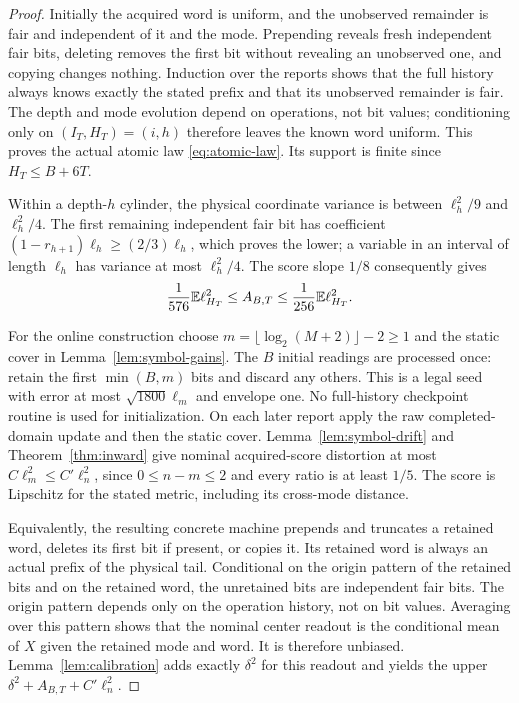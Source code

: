 \begin{proof}
Initially the acquired word is uniform, and the unobserved remainder is fair and independent of it and the mode. Prepending reveals fresh independent fair bits, deleting removes the first bit without revealing an unobserved one, and copying changes nothing. Induction over the reports shows that the full history always knows exactly the stated prefix and that its unobserved remainder is fair. The depth and mode evolution depend on operations, not bit values; conditioning only on $(I_T,H_T)=(i,h)$ therefore leaves the known word uniform. This proves the actual atomic law \eqref{eq:atomic-law}. Its support is finite since $H_T\le B+6T$.

Within a depth-$h$ cylinder, the physical coordinate variance is between $\ell_h^2/9$ and $\ell_h^2/4$. The first remaining independent fair bit has coefficient $(1-r_{h+1})\ell_h\ge(2/3)\ell_h$, which proves the lower; a variable in an interval of length $\ell_h$ has variance at most $\ell_h^2/4$. The score slope $1/8$ consequently gives
\begin{equation}\label{eq:symbol-acquisition}
 \frac1{576}\mathbb E\ell_{H_T}^2
 \le A_{B,T}\le\frac1{256}\mathbb E\ell_{H_T}^2.
\end{equation}

For the online construction choose $m=\lfloor\log_2(M+2)\rfloor-2\ge1$ and the static cover in Lemma~\ref{lem:symbol-gains}. The $B$ initial readings are processed once: retain the first $\min(B,m)$ bits and discard any others. This is a legal seed with error at most $\sqrt{1800}\ell_m$ and envelope one. No full-history checkpoint routine is used for initialization. On each later report apply the raw completed-domain update and then the static cover. Lemma~\ref{lem:symbol-drift} and Theorem~\ref{thm:inward} give nominal acquired-score distortion at most $C\ell_m^2\le C'\ell_n^2$, since $0\le n-m\le2$ and every ratio is at least $1/5$. The score is Lipschitz for the stated metric, including its cross-mode distance.

Equivalently, the resulting concrete machine prepends and truncates a retained word, deletes its first bit if present, or copies it. Its retained word is always an actual prefix of the physical tail. Conditional on the origin pattern of the retained bits and on the retained word, the unretained bits are independent fair bits. The origin pattern depends only on the operation history, not on bit values. Averaging over this pattern shows that the nominal center readout is the conditional mean of $X$ given the retained mode and word. It is therefore unbiased. Lemma~\ref{lem:calibration} adds exactly $\delta^2$ for this readout and yields the upper $\delta^2+A_{B,T}+C'\ell_n^2$.


\end{proof}
